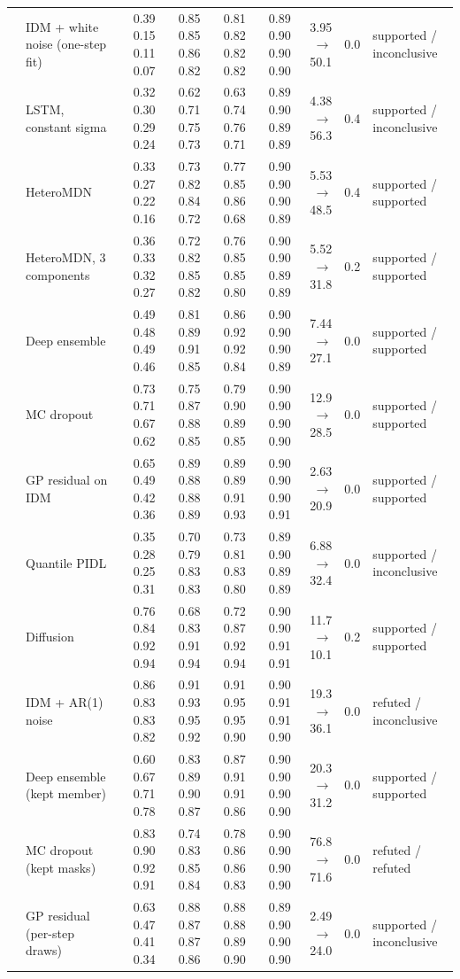 \begin{longtable}{llrrrrrrl}
 & IDM + white noise (one-step fit) & 0.39 0.15 0.11 0.07 & 0.85 0.85 0.86 0.82 & 0.81 0.82 0.82 0.82 & 0.89 0.90 0.90 0.90 & 3.95 $\rightarrow$ 50.1 & 0.0 & supported / inconclusive \\
 & LSTM, constant sigma & 0.32 0.30 0.29 0.24 & 0.62 0.71 0.75 0.73 & 0.63 0.74 0.76 0.71 & 0.89 0.90 0.89 0.89 & 4.38 $\rightarrow$ 56.3 & 0.4 & supported / inconclusive \\
 & HeteroMDN & 0.33 0.27 0.22 0.16 & 0.73 0.82 0.84 0.72 & 0.77 0.85 0.86 0.68 & 0.90 0.90 0.90 0.89 & 5.53 $\rightarrow$ 48.5 & 0.4 & supported / supported \\
 & HeteroMDN, 3 components & 0.36 0.33 0.32 0.27 & 0.72 0.82 0.85 0.82 & 0.76 0.85 0.85 0.80 & 0.90 0.90 0.89 0.89 & 5.52 $\rightarrow$ 31.8 & 0.2 & supported / supported \\
 & Deep ensemble & 0.49 0.48 0.49 0.46 & 0.81 0.89 0.91 0.85 & 0.86 0.92 0.92 0.84 & 0.90 0.90 0.90 0.89 & 7.44 $\rightarrow$ 27.1 & 0.0 & supported / supported \\
 & MC dropout & 0.73 0.71 0.67 0.62 & 0.75 0.87 0.88 0.85 & 0.79 0.90 0.89 0.85 & 0.90 0.90 0.90 0.90 & 12.9 $\rightarrow$ 28.5 & 0.0 & supported / supported \\
 & GP residual on IDM & 0.65 0.49 0.42 0.36 & 0.89 0.88 0.88 0.89 & 0.89 0.89 0.91 0.93 & 0.90 0.90 0.90 0.91 & 2.63 $\rightarrow$ 20.9 & 0.0 & supported / supported \\
 & Quantile PIDL & 0.35 0.28 0.25 0.31 & 0.70 0.79 0.83 0.83 & 0.73 0.81 0.83 0.80 & 0.89 0.90 0.89 0.89 & 6.88 $\rightarrow$ 32.4 & 0.0 & supported / inconclusive \\
 & Diffusion & 0.76 0.84 0.92 0.94 & 0.68 0.83 0.91 0.94 & 0.72 0.87 0.92 0.94 & 0.90 0.90 0.91 0.91 & 11.7 $\rightarrow$ 10.1 & 0.2 & supported / supported \\
 & IDM + AR(1) noise & 0.86 0.83 0.83 0.82 & 0.91 0.93 0.95 0.92 & 0.91 0.95 0.95 0.90 & 0.90 0.91 0.91 0.90 & 19.3 $\rightarrow$ 36.1 & 0.0 & refuted / inconclusive \\
 & Deep ensemble (kept member) & 0.60 0.67 0.71 0.78 & 0.83 0.89 0.90 0.87 & 0.87 0.91 0.91 0.86 & 0.90 0.90 0.90 0.90 & 20.3 $\rightarrow$ 31.2 & 0.0 & supported / supported \\
 & MC dropout (kept masks) & 0.83 0.90 0.92 0.91 & 0.74 0.83 0.85 0.84 & 0.78 0.86 0.86 0.83 & 0.90 0.90 0.90 0.90 & 76.8 $\rightarrow$ 71.6 & 0.0 & refuted / refuted \\
 & GP residual (per-step draws) & 0.63 0.47 0.41 0.34 & 0.88 0.87 0.87 0.86 & 0.88 0.88 0.89 0.90 & 0.89 0.90 0.90 0.90 & 2.49 $\rightarrow$ 24.0 & 0.0 & supported / inconclusive \\
\end{longtable}
\endgroup
